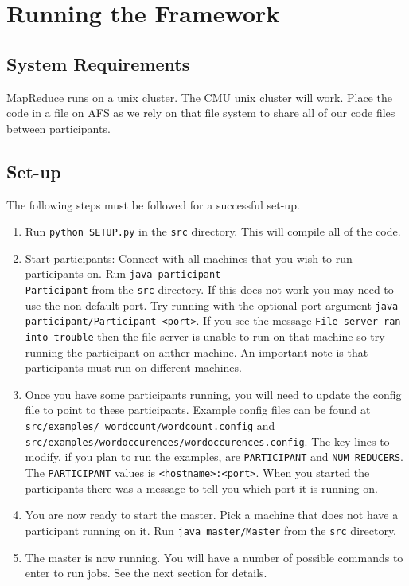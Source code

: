 \documentclass[12pt]{article}
\newcommand{\ttt}{\texttt}
\begin{document}
\maketitle

\pagebreak
\section{Running the Framework}

\subsection{System Requirements}

MapReduce runs on a unix cluster. The CMU unix cluster will work. Place the code in a file on AFS as we rely on that file system to share all of our code files between participants.

\subsection{Set-up}

The following steps must be followed for a successful set-up.

\begin{enumerate}
\item 
Run \ttt{python SETUP.py} in the \ttt{src} directory. This will compile all of the code.

\item
Start participants: Connect with all machines that you wish to run participants on. Run \ttt{java participant\\Participant} from the \ttt{src} directory. If this does not work you may need to use the non-default port. Try running with the optional port argument \ttt{java participant/Participant <port>}. If you see the message \ttt{File server ran into trouble} then the file server is unable to run on that machine so try running the participant on anther machine. An important note is that participants must run on different machines.

\item
Once you have some participants running, you will need to update the config file to point to these participants. Example config files can be found at \ttt{src/examples/ wordcount/wordcount.config} and \ttt{src/examples/wordoccurences/wordoccurences.config}. The key lines to modify, if you plan to run the examples, are \ttt{PARTICIPANT} and \ttt{NUM\_REDUCERS}. The \ttt{PARTICIPANT} values is \ttt{<hostname>:<port>}. When you started the participants there was a message to tell you which port it is running on.

\item
You are now ready to start the master. Pick a machine that does not have a participant running on it. Run \ttt{java master/Master} from the \ttt{src} directory.

\item
The master is now running. You will have a number of possible commands to enter to run jobs. See the next section for details.

\end{enumerate}
\end{document}
